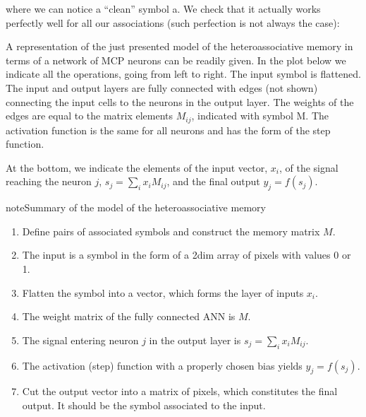 \documentclass[letterpaper,10pt,english]{jupyterBook}
\begin{document}
\sphinxAtStartPar
where we can notice a “clean” symbol a. We check that it actually works perfectly well for all our associations (such perfection is not always the case):

\noindent{}

\sphinxAtStartPar
A representation of the just presented model of the heteroassociative memory in terms of a  network of MCP neurons can be readily given. In the plot below we indicate all the operations, going from left to right. The input symbol is flattened. The input and output layers are fully connected with edges (not shown) connecting the input cells to the neurons in the output layer. The weights of the edges are equal to the matrix elements \(M_{ij}\), indicated with symbol M. The activation function is the same for all neurons and has the form of the step function.

\sphinxAtStartPar
At the bottom, we indicate the elements of the input vector, \(x_i\), of the signal reaching the neuron \(j\), \(s_j=\sum_i x_i M_{ij}\), and the final output \(y_j=f(s_j)\).

\noindent{}

\begin{sphinxadmonition}{note}{Summary of the model of the heteroassociative memory}
\begin{enumerate}
%
\item {} 
\sphinxAtStartPar
Define pairs of associated symbols and construct the memory matrix \(M\).

\item {} 
\sphinxAtStartPar
The input is a symbol in the form of a 2\sphinxhyphen{}dim array of pixels with values 0 or 1.

\item {} 
\sphinxAtStartPar
Flatten the symbol into a vector, which forms the layer of inputs \(x_i\).

\item {} 
\sphinxAtStartPar
The weight matrix of the fully connected ANN is \(M\).

\item {} 
\sphinxAtStartPar
The signal entering neuron \(j\) in the output layer is \(s_j=\sum_i x_i M_{ij}\).

\item {} 
\sphinxAtStartPar
The activation (step) function with a properly chosen bias yields \(y_j=f(s_j)\).

\item {} 
\sphinxAtStartPar
Cut the output vector into a matrix of pixels, which constitutes the final output.
It should be the symbol associated to the input.

\end{enumerate}
\end{sphinxadmonition}
\end{document}
